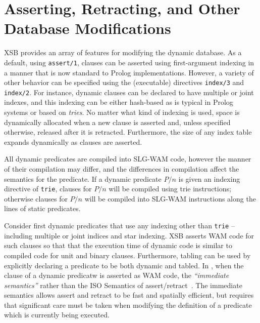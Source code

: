 
\section{Asserting, Retracting, and Other Database Modifications} \label{sec:assert}

XSB provides an array of features for modifying the dynamic database.
As a default, using {\tt assert/1}, clauses can be asserted using
first-argument indexing in a manner that is now standard to Prolog
implementations.  However, a variety of other behavior can be
specified using the (executable) directives {\tt index/3} and {\tt
  index/2}.  For instance, dynamic clauses can be declared to have
multiple or joint indexes, and this indexing can be either hash-based
as is typical in Prolog systems or based on {\em tries}.  No matter
what kind of indexing is used, space is dynamically allocated when a
new clause is asserted and, unless specified otherwise, released after
it is retracted.  Furthermore, the size of any index table expands
dynamically as clauses are asserted.

All dynamic predicates are compiled into SLG-WAM code, however the
manner of their compilation may differ, and the differences in
compilation affect the semantics for the predicate.  If a dynamic
predicate $P/n$ is given an indexing directive of {\tt trie}, clauses
for $P/n$ will be compiled using trie instructions; otherwise clauses
for $P/n$ will be compiled into SLG-WAM instructions along the lines
of static predicates. 

Consider first dynamic predicates that use any indexing other than
{\tt trie} -- including multiple or joint indices and star indexing.
XSB asserts WAM code for such clauses so that that the execution time
of dynamic code is similar to compiled code for unit and binary
clauses.  Furthermore, tabling can be used by explicitly declaring a
predicate to be both dynamic and tabled.  In \version{}, when the
clause of a dynamic predicatw is asserted as WAM code, the {\em
  ``immediate semantics''} rather than the ISO Semantics of
assert/retract~\cite{LiOk87}.  The immediate semantics allows assert
and retract to be fast and spatially efficient, but requires that
significant care must be taken when modifying the definition of a
predicate which is currently being executed.


